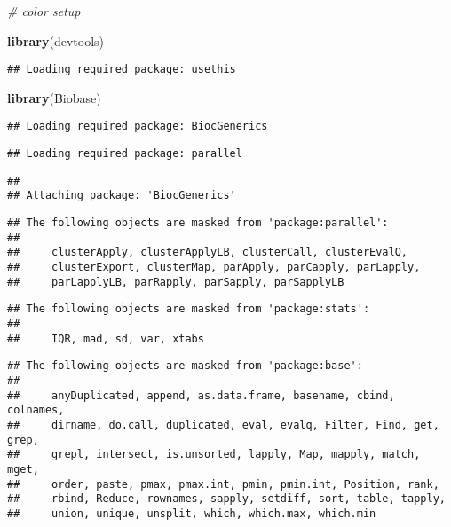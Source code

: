 \documentclass[]{article}
\newenvironment{Shaded}{\begin{snugshade}}{\end{snugshade}}
\newcommand{\KeywordTok}[1]{\textcolor[rgb]{0.13,0.29,0.53}{\textbf{#1}}}
\newcommand{\CommentTok}[1]{\textcolor[rgb]{0.56,0.35,0.01}{\textit{#1}}}
\newcommand{\NormalTok}[1]{#1}
\begin{document}
\begin{Shaded}
\begin{Highlighting}[]
\CommentTok{# color setup}

\KeywordTok{library}\NormalTok{(devtools)}
\end{Highlighting}
\end{Shaded}

\begin{verbatim}
## Loading required package: usethis
\end{verbatim}

\begin{Shaded}
\begin{Highlighting}[]
\KeywordTok{library}\NormalTok{(Biobase)}
\end{Highlighting}
\end{Shaded}

\begin{verbatim}
## Loading required package: BiocGenerics
\end{verbatim}

\begin{verbatim}
## Loading required package: parallel
\end{verbatim}

\begin{verbatim}
## 
## Attaching package: 'BiocGenerics'
\end{verbatim}

\begin{verbatim}
## The following objects are masked from 'package:parallel':
## 
##     clusterApply, clusterApplyLB, clusterCall, clusterEvalQ,
##     clusterExport, clusterMap, parApply, parCapply, parLapply,
##     parLapplyLB, parRapply, parSapply, parSapplyLB
\end{verbatim}

\begin{verbatim}
## The following objects are masked from 'package:stats':
## 
##     IQR, mad, sd, var, xtabs
\end{verbatim}

\begin{verbatim}
## The following objects are masked from 'package:base':
## 
##     anyDuplicated, append, as.data.frame, basename, cbind, colnames,
##     dirname, do.call, duplicated, eval, evalq, Filter, Find, get, grep,
##     grepl, intersect, is.unsorted, lapply, Map, mapply, match, mget,
##     order, paste, pmax, pmax.int, pmin, pmin.int, Position, rank,
##     rbind, Reduce, rownames, sapply, setdiff, sort, table, tapply,
##     union, unique, unsplit, which, which.max, which.min
\end{verbatim}
\end{document}
